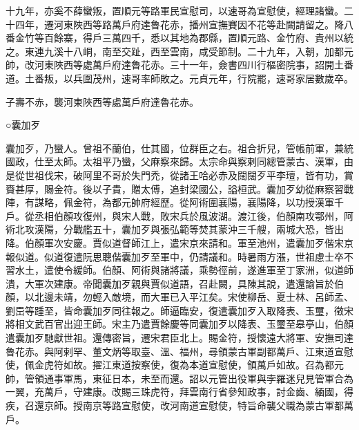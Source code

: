 \begin{pinyinscope}
 十九年，亦奚不薛蠻叛，置順元等路軍民宣慰司，以速哥為宣慰使，經理諸蠻。二十四年，遷河東陜西等路萬戶府達魯花赤，播州宣撫賽因不花等赴闕請留之。降八番金竹等百餘寨，得戶三萬四千，悉以其地為郡縣，置順元路、金竹府、貴州以統之。東連九溪十八峒，南至交趾，西至雲南，咸受節制。二十九年，入朝，加都元帥，改河東陜西等處萬戶府達魯花赤。三十一年，僉書四川行樞密院事，詔開土番道。土番叛，以兵圍茂州，速哥率師敗之。元貞元年，行院罷，速哥家居數歲卒。



 子壽不赤，襲河東陜西等處萬戶府達魯花赤。



 ○囊加歹



 囊加歹，乃蠻人。曾祖不蘭伯，仕其國，位群臣之右。祖合折兒，管帳前軍，兼統國政，仕至太師。太祖平乃蠻，父麻察來歸。太宗命與察剌同總管蒙古、漢軍，由是從世祖伐宋，破阿里不哥於失門禿，從諸王哈必赤及闊闊歹平李璮，皆有功，賞賚甚厚，賜金符。後以子貴，贈太傅，追封梁國公，謚桓武。囊加歹幼從麻察習戰陣，有謀略，佩金符，為都元帥府經歷。從阿術圍襄陽，襄陽降，以功授漢軍千戶。從丞相伯顏攻復州，與宋人戰，敗宋兵於風波湖。渡江後，伯顏南攻鄂州，阿術北攻漢陽，分戰艦五十，囊加歹與張弘範等焚其蒙沖三千艘，兩城大恐，皆出降。伯顏軍次安慶。賈似道督師江上，遣宋京來請和。軍至池州，遣囊加歹偕宋京報似道。似道復遣阮思聰偕囊加歹至軍中，仍請議和。時暑雨方漲，世祖慮士卒不習水土，遣使令緩師。伯顏、阿術與諸將議，乘勢徑前，遂進軍至丁家洲，似道師潰，大軍次建康。帝聞囊加歹親與賈似道語，召赴闕，具陳其說，遣還諭旨於伯顏，以北邊未靖，勿輕入敵境，而大軍已入平江矣。宋使柳岳、夏士林、呂師孟、劉岊等踵至，皆命囊加歹同往報之。師逼臨安，復遣囊加歹入取降表、玉璽，徵宋將相文武百官出迎王師。宋主乃遣賈餘慶等同囊加歹以降表、玉璽至皋亭山，伯顏遣囊加歹馳獻世祖。還傳密旨，遷宋君臣北上。賜金符，授懷遠大將軍、安撫司達魯花赤。與阿剌罕、董文炳等取臺、溫、福州，尋領蒙古軍副都萬戶、江東道宣慰使，佩金虎符如故。擢江東道按察使，復為本道宣慰使，領萬戶如故。召為都元帥，管領通事軍馬，東征日本，未至而還。詔以元管出役軍與孛羅迷兒見管軍合為一翼，充萬戶，守建康。改賜三珠虎符，拜雲南行省參知政事，討金齒、緬國，得疾，召還京師。授南京等路宣慰使，改河南道宣慰使，特旨命襲父職為蒙古軍都萬戶。




\end{pinyinscope}
